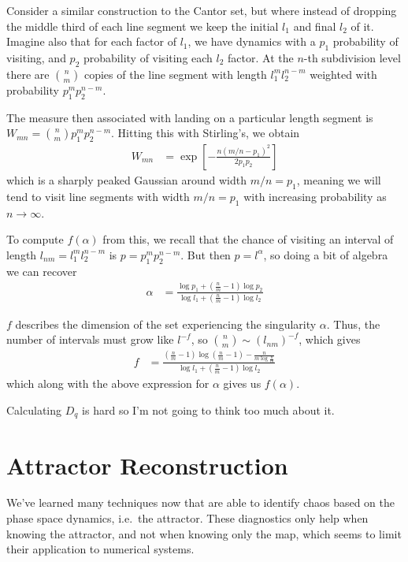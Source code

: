 \documentclass[12pt]{article}
\begin{document}
Consider a similar construction to the Cantor set, but where instead of dropping
the middle third of each line segment we keep the initial $l_1$ and final $l_2$
of it. Imagine also that for each factor of $l_1$, we have dynamics with a $p_1$
probability of visiting, and $p_2$ probability of visiting each $l_2$ factor. At
the $n$-th subdivision level there are $\binom{n}{m}$ copies of the line segment
with length $l_1^ml_2^{n-m}$ weighted with probability $p_1^m p_2^{n-m}$.

The measure then associated with landing on a particular length segment is
$W_{mn} = \binom{n}{m}p_1^mp_2^{n-m}$. Hitting this with Stirling's, we obtain
\begin{align}
    W_{mn} &= \exp\left[ -\frac{n(m/n - p_1)^2}{2p_1p_2} \right]
\end{align}
which is a sharply peaked Gaussian around width $m/n = p_1$, meaning we will
tend to visit line segments with width $m/n = p_1$ with increasing probability
as $n \to \infty$.

To compute $f(\alpha)$ from this, we recall that the chance of visiting an
interval of length $l_{nm} = l_1^ml_2^{n-m}$ is $p = p_1^mp_2^{n-m}$. But then
$p = l^\alpha$, so doing a bit of algebra we can recover
\begin{align}
    \alpha &= \frac{\log p_1 + \left( \frac{n}{m} - 1 \right)\log p_2}
        {\log l_1 + \left( \frac{n}{m} - 1 \right)\log l_2}
\end{align}

$f$ describes the dimension of the set experiencing the singularity $\alpha$.
Thus, the number of intervals must grow like $l^{-f}$, so
$\binom{n}{m} \sim \left( l_{nm} \right)^{-f}$, which gives
\begin{align}
    f &= \frac{\left( \frac{n}{m} - 1 \right)\log \left( \frac{n}{m} - 1 \right)
        - \frac{n}{m\log \frac{n}{m}}}{\log l_1 + \left( \frac{n}{m} - 1 \right)
        \log l_2}
\end{align}
which along with the above expression for $\alpha$ gives us $f(\alpha)$.

Calculating $D_q$ is hard so I'm not going to think too much about it.

\clearpage

\section{Attractor Reconstruction}

We've learned many techniques now that are able to identify chaos based on the
phase space dynamics, i.e.\ the attractor. These diagnostics only help when
knowing the attractor, and not when knowing only the map, which seems to limit
their application to numerical systems.
\end{document}
